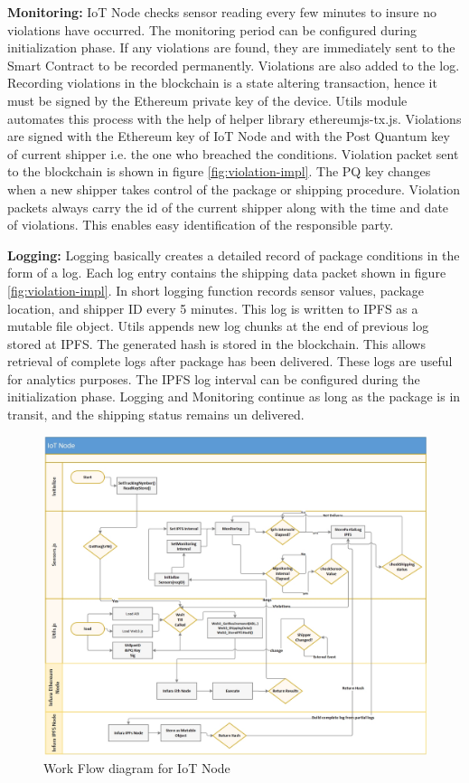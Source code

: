 \textbf{Monitoring:}
IoT Node checks sensor reading every few minutes to insure no violations have occurred. The monitoring period can be configured during initialization phase. If any violations are found, they are immediately sent to the Smart Contract to be recorded permanently. Violations are also added to the log. Recording violations in the blockchain is a state altering transaction, hence it must be signed by the Ethereum private key of the device. Utils module automates this process with the help of helper library ethereumjs-tx.js. Violations are signed with the Ethereum key of IoT Node and with the Post Quantum key of current shipper i.e. the one who breached the conditions. Violation packet sent to the blockchain is shown in figure \ref{fig:violation-impl}. The PQ key changes when a new shipper takes control of the package or shipping procedure.  Violation packets always carry the id of the current shipper along with the time and date of violations. This enables easy identification of the responsible party.

\textbf{Logging:}
Logging basically creates a detailed record of package conditions in the form of a log.  Each log entry contains the shipping data packet shown in figure \ref{fig:violation-impl}. In short logging function records sensor values, package location, and shipper ID every 5 minutes. This log is written to IPFS as a mutable file object. Utils appends new log chunks at the end of previous log stored at IPFS. The generated hash is stored in the blockchain. This allows retrieval of complete logs after package has been delivered. These logs are useful for analytics purposes. The IPFS log interval can be configured during the initialization phase. Logging and Monitoring continue as long as the package is in transit, and the shipping status remains un delivered.

\begin{figure}[h]
	\centering
    \includegraphics[width=180mm,scale=1]{figs/IoTNode}
	\caption{Work Flow diagram for IoT Node}
	\label{fig:IoTNode} 
\end{figure}
\clearpage

